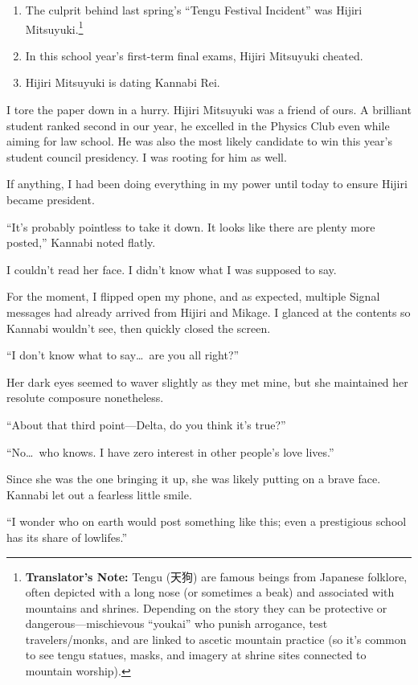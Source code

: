 \documentclass[
    a4paper,
    12pt,
    twoside,
    openany,
    UTF8,
    fontset=windows
]{ctexbook}
\begin{document}
{\bfseries
\begin{enumerate}
\item The culprit behind last spring's ``Tengu Festival Incident'' was Hijiri Mitsuyuki.\footnote{\textbf{Translator's Note:} Tengu (天狗) are famous beings from Japanese folklore, often depicted with a long nose (or sometimes a beak) and associated with mountains and shrines. Depending on the story they can be protective or dangerous---mischievous ``youkai'' who punish arrogance, test travelers/monks, and are linked to ascetic mountain practice (so it's common to see tengu statues, masks, and imagery at shrine sites connected to mountain worship).}
\item In this school year's first-term final exams, Hijiri Mitsuyuki cheated.
\item Hijiri Mitsuyuki is dating Kannabi Rei.
\end{enumerate}
}

I tore the paper down in a hurry. Hijiri Mitsuyuki was a friend of ours. A brilliant student ranked second in our year, he excelled in the Physics Club even while aiming for law school. He was also the most likely candidate to win this year's student council presidency. I was rooting for him as well.

If anything, I had been doing everything in my power until today to ensure Hijiri became president.

``It's probably pointless to take it down. It looks like there are plenty more posted,'' Kannabi noted flatly.

I couldn't read her face. I didn't know what I was supposed to say.

For the moment, I flipped open my phone, and as expected, multiple Signal messages had already arrived from Hijiri and Mikage. I glanced at the contents so Kannabi wouldn't see, then quickly closed the screen.

``I don't know what to say\dots\ are you all right?''

Her dark eyes seemed to waver slightly as they met mine, but she maintained her resolute composure nonetheless.

``About that third point---Delta, do you think it's true?''

``No\dots\ who knows. I have zero interest in other people's love lives.''

Since she was the one bringing it up, she was likely putting on a brave face. Kannabi let out a fearless little smile.

``I wonder who on earth would post something like this; even a prestigious school has its share of lowlifes.''
\end{document}
